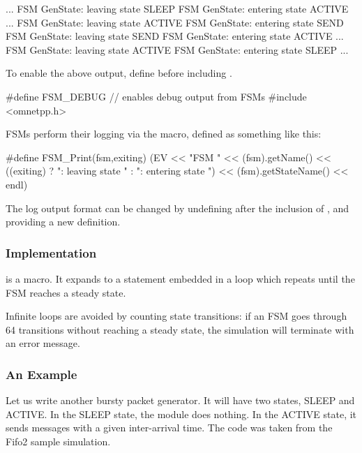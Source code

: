 \begin{filelisting}
...
FSM GenState: leaving state SLEEP
FSM GenState: entering state ACTIVE
...
FSM GenState: leaving state ACTIVE
FSM GenState: entering state SEND
FSM GenState: leaving state SEND
FSM GenState: entering state ACTIVE
...
FSM GenState: leaving state ACTIVE
FSM GenState: entering state SLEEP
...
\end{filelisting}

To enable the above output, define  before including .

\begin{cpp}
#define FSM_DEBUG    // enables debug output from FSMs
#include <omnetpp.h>
\end{cpp}

FSMs perform their logging via the  macro, defined as something like this:

\begin{cpp}
#define FSM_Print(fsm,exiting)
  (EV << "FSM " << (fsm).getName()
      << ((exiting) ? ": leaving state " : ": entering state ")
      << (fsm).getStateName() << endl)
\end{cpp}

The log output format can be changed by undefining  after the
inclusion of , and providing a new definition.


\subsubsection{Implementation}
\label{sec:simple-modules:fsm-implementation}

 is a macro. It expands to a 
statement embedded in a  loop which repeats until the
FSM reaches a steady state.

Infinite loops are avoided by counting state transitions: if
an FSM goes through 64 transitions without reaching a steady
state, the simulation will terminate with an error message.


\subsubsection{An Example}
\label{sec:simple-modules:fsm-example}

Let us write another bursty packet generator. It will have two
states, SLEEP and ACTIVE. In the SLEEP state, the module does
nothing. In the ACTIVE state, it sends messages with a given
inter-arrival time. The code was taken from the Fifo2 sample
simulation.


